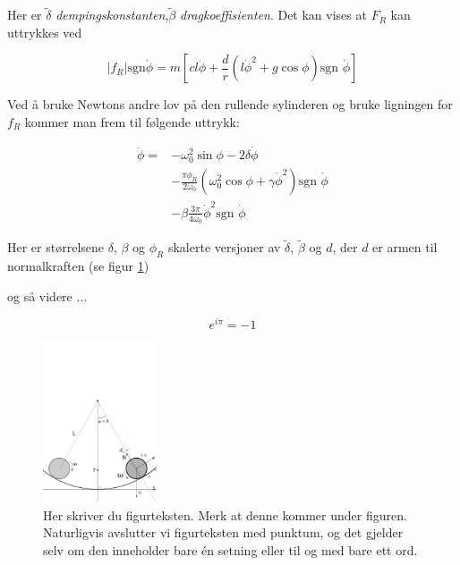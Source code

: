 \documentclass[5p]{elsarticle}
\begin{document}
Her er \(\tilde{\delta}\) \textit{dempingskonstanten},\(\tilde{\beta}\) \textit{dragkoeffisienten}.
Det kan vises at \(F_R\) kan uttrykkes ved

\begin{equation}
	|f_R|\text{sgn}\dot{\phi} =
	m\left[
		cl\ddot{\phi}+\frac{d}{r}
		\left(l\dot{\phi}^2 + g\cos\phi\right)
		\text{sgn }\dot{\phi}
	\right]
\end{equation}

Ved å bruke Newtons andre lov på den rullende sylinderen 
og bruke ligningen for \(f_R\) kommer man frem til følgende uttrykk:

\begin{equation}
	\begin{split}	
		\ddot{\phi} = 	
		&- \omega_0^2\sin\phi - 2\delta\dot{\phi}	\\
		&- \frac{\pi\phi_R}{2\omega_0}
		\left(\omega_0^2\cos\phi + \gamma\dot{\phi}^2\right) \text{sgn } \dot{\phi} \\
		&- \beta \frac{3\pi}{4\omega_0}\dot{\phi}^2\text{sgn }\dot{\phi} 
	\end{split}
\end{equation}

Her er størrelsene \(\delta\), \(\beta\) og \(\phi_R\) skalerte versjoner av 
\(\tilde{\delta}\), \(\tilde{\beta}\) og \(d\), der \(d\) er armen til normalkraften (se figur \ref{Figur})

og så videre ...

\[e^{i\pi} = -1\]
\begin{figure}[] 
  \begin{center}
      \includegraphics[width=0.3\textwidth]{drawing}  %
  \end{center}
  \caption{Her skriver du figurteksten. Merk at denne kommer under figuren. Naturligvis avslutter vi figurteksten med punktum,
  og det gjelder selv om den inneholder bare én setning eller til og med bare ett ord.}
  \label{Figur} %
\end{figure}
\end{document}
